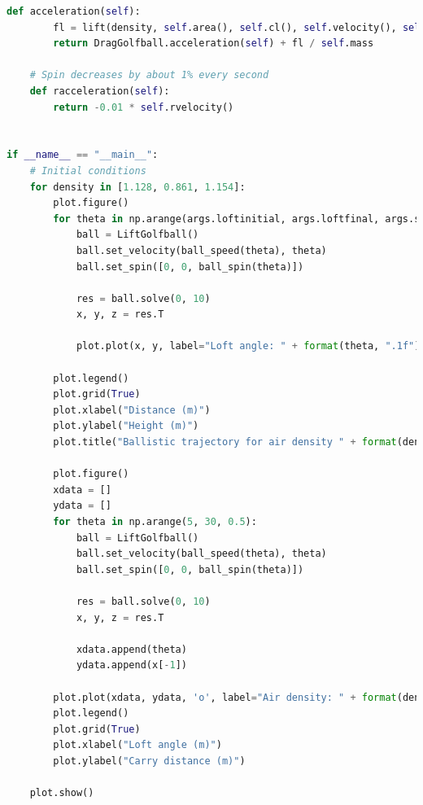 \documentclass[12pt]{article}
\begin{document}
\begin{lstlisting}[language=Python, caption=Python model), style=PythonStyle, basicstyle=\tiny]
	def acceleration(self):
		fl = lift(density, self.area(), self.cl(), self.velocity(), self.rvelocity())
		return DragGolfball.acceleration(self) + fl / self.mass

	# Spin decreases by about 1% every second
	def racceleration(self):
		return -0.01 * self.rvelocity()


if __name__ == "__main__":
	# Initial conditions
	for density in [1.128, 0.861, 1.154]:
		plot.figure()
		for theta in np.arange(args.loftinitial, args.loftfinal, args.step):
			ball = LiftGolfball()
			ball.set_velocity(ball_speed(theta), theta)
			ball.set_spin([0, 0, ball_spin(theta)])

			res = ball.solve(0, 10)
			x, y, z = res.T

			plot.plot(x, y, label="Loft angle: " + format(theta, ".1f"))

		plot.legend()
		plot.grid(True)
		plot.xlabel("Distance (m)")
		plot.ylabel("Height (m)")
		plot.title("Ballistic trajectory for air density " + format(density, ".3f") + " kg/m^3")

		plot.figure()
		xdata = []
		ydata = []
		for theta in np.arange(5, 30, 0.5):
			ball = LiftGolfball()
			ball.set_velocity(ball_speed(theta), theta)
			ball.set_spin([0, 0, ball_spin(theta)])

			res = ball.solve(0, 10)
			x, y, z = res.T

			xdata.append(theta)
			ydata.append(x[-1])

		plot.plot(xdata, ydata, 'o', label="Air density: " + format(density, ".3f"))
		plot.legend()
		plot.grid(True)
		plot.xlabel("Loft angle (m)")
		plot.ylabel("Carry distance (m)")

	plot.show()
\end{lstlisting}
\end{document}
